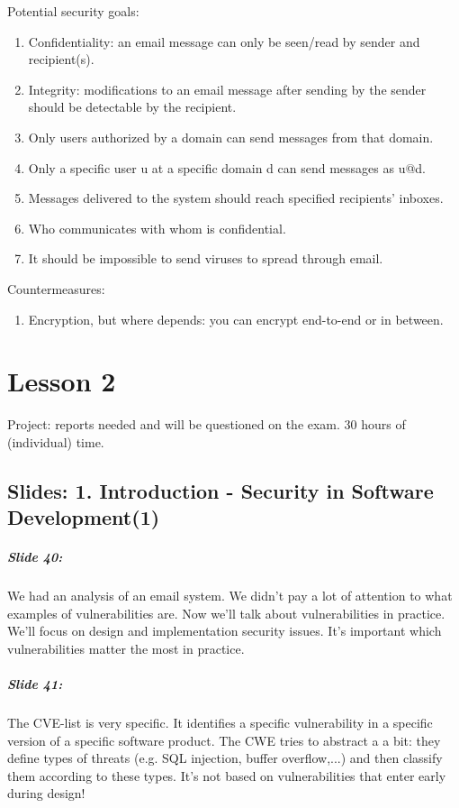 \documentclass[10pt,a4paper]{report}
\begin{document}
Potential security goals:
\begin{enumerate}
\item Confidentiality: an email message can only be seen/read by sender and recipient(s).
\item Integrity: modifications to an email message after sending by the sender should be detectable by the recipient.
\item Only users authorized by a domain can send messages from that domain.
\item Only a specific user u at a specific domain d can send messages as u@d.
\item Messages delivered to the system should reach specified recipients' inboxes.
\item Who communicates with whom is confidential.
\item It should be impossible to send viruses to spread through email.
\end{enumerate}
Countermeasures:
\begin{enumerate}
\item Encryption, but where depends: you can encrypt end-to-end or in between.
\end{enumerate}

\chapter{Lesson 2}
Project: reports needed and will be questioned on the exam. 30 hours of (individual) time. 

\section{Slides: 1. Introduction - Security in Software Development(1)}

\paragraph{Slide 40:} We had an analysis of an email system. We didn't pay a lot of attention to what examples of vulnerabilities are. Now we'll talk about vulnerabilities in practice. We'll focus on design and implementation security issues. It's important which vulnerabilities matter the most in practice. 

\paragraph{Slide 41:} The CVE-list is very specific. It identifies a specific vulnerability in a specific version of a specific software product. The CWE tries to abstract a a bit: they define types of threats (e.g. SQL injection, buffer overflow,...) and then classify them according to these types.
It's not based on vulnerabilities that enter early during design! 
\end{document}
